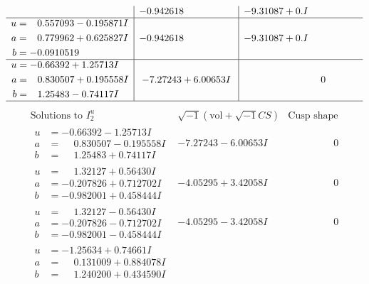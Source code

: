 \documentclass[1p]{elsarticle_modified}
\theoremstyle{definition}
\newcommand{\I}{\sqrt{-1}}
\begin{document}
$$\begin{array}{c|c|c}
 & -0.942618\phantom{ +0.000000I} & -9.31087 + 0. I\phantom{ +0.000000I} \\ \hline\begin{aligned}
u &= \phantom{-}0.557093 - 0.195871 I \\
a &= \phantom{-}0.779962 + 0.625827 I \\
b &= -0.0910519\phantom{ +0.000000I}\end{aligned}
 & -0.942618\phantom{ +0.000000I} & -9.31087 + 0. I\phantom{ +0.000000I} \\ \hline\begin{aligned}
u &= -0.66392 + 1.25713 I \\
a &= \phantom{-}0.830507 + 0.195558 I \\
b &= \phantom{-}1.25483 - 0.74117 I\end{aligned}
 & -7.27243 + 6.00653 I & \phantom{-0.000000 } 0\\
 \hline 
 \end{array}$$\newpage$$\begin{array}{c|c|c}  
\text{Solutions to }I^u_{2}& \I (\text{vol} + \sqrt{-1}CS) & \text{Cusp shape}\\
 \hline 
\begin{aligned}
u &= -0.66392 - 1.25713 I \\
a &= \phantom{-}0.830507 - 0.195558 I \\
b &= \phantom{-}1.25483 + 0.74117 I\end{aligned}
 & -7.27243 - 6.00653 I & \phantom{-0.000000 } 0 \\ \hline\begin{aligned}
u &= \phantom{-}1.32127 + 0.56430 I \\
a &= -0.207826 + 0.712702 I \\
b &= -0.982001 + 0.458444 I\end{aligned}
 & -4.05295 + 3.42058 I & \phantom{-0.000000 } 0 \\ \hline\begin{aligned}
u &= \phantom{-}1.32127 - 0.56430 I \\
a &= -0.207826 - 0.712702 I \\
b &= -0.982001 - 0.458444 I\end{aligned}
 & -4.05295 - 3.42058 I & \phantom{-0.000000 } 0 \\ \hline\begin{aligned}
u &= -1.25634 + 0.74661 I \\
a &= \phantom{-}0.131009 + 0.884078 I \\
b &= \phantom{-}1.240200 + 0.434590 I\end{aligned}

\end{array}$$
\end{document}

